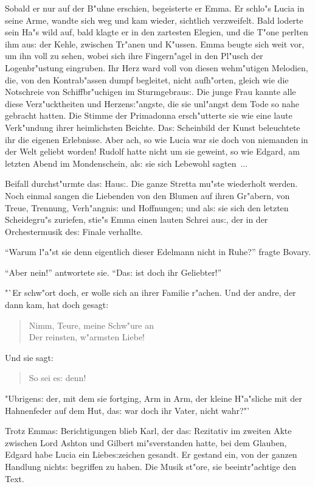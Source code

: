 \documentclass[oneside,12pt]{book}
\newcommand{\s}{s:}%
\begin{document}
Sobald er nur auf der B"uhne erschien, begeisterte er Emma. Er
schlo"s Lucia in seine Arme, wandte sich weg und kam wieder,
sichtlich verzweifelt. Bald loderte sein Ha"s wild auf, bald
klagte er in den zartesten Elegien, und die T"one perlten ihm
au{\s} der Kehle, zwischen Tr"anen und K"ussen. Emma beugte sich
weit vor, um ihn voll zu sehen, wobei sich ihre Fingern"agel in
den Pl"usch der Logenbr"ustung eingruben. Ihr Herz ward voll von
diesen wehm"utigen Melodien, die, von den Kontrab"assen dumpf
begleitet, nicht aufh"orten, gleich wie die Notschreie von
Schiffbr"uchigen im Sturmgebrau{\s}. Die junge Frau kannte alle
diese Verz"ucktheiten und Herzen{\s}"angste, die sie unl"angst
dem Tode so nahe gebracht hatten. Die Stimme der Primadonna
ersch"utterte sie wie eine laute Verk"undung ihrer heimlichsten
Beichte. Da{\s} Scheinbild der Kunst beleuchtete ihr die eigenen
Erlebnisse. Aber ach, so wie Lucia war sie doch von niemanden in
der Welt geliebt worden! Rudolf hatte nicht um sie geweint, so wie
Edgard, am letzten Abend im Mondenschein, al{\s} sie sich Lebewohl
sagten~...

Beifall durchst"urmte da{\s} Hau{\s}. Die ganze Stretta mu"ste
wiederholt werden. Noch einmal sangen die Liebenden von den Blumen
auf ihren Gr"abern, von Treue, Trennung, Verh"angni{\s} und
Hoffnungen; und al{\s} sie sich den letzten Scheidegru"s zuriefen,
stie"s Emma einen lauten Schrei au{\s}, der in der Orchestermusik
de{\s} Finale verhallte.

"`Warum l"a"st sie denn eigentlich dieser Edelmann nicht in
Ruhe?"' fragte Bovary.

"`Aber nein!"' antwortete sie. "`Da{\s} ist doch ihr Geliebter!"'

"`Er schw"ort doch, er wolle sich an ihrer Familie r"achen. Und
der andre, der dann kam, hat doch gesagt:
\begin{verse}
{\glq}Nimm, Teure, meine Schw"ure an \\
Der reinsten, w"armsten Liebe!{\grq}
\end{verse}
Und sie sagt:
\begin{verse}
{\glq}So sei e{\s} denn!{\grq}
\end{verse}
"Ubrigen{\s} der, mit dem sie fortging, Arm in Arm, der kleine
H"a"sliche mit der Hahnenfeder auf dem Hut, da{\s} war doch ihr
Vater, nicht wahr?"'

Trotz Emma{\s} Berichtigungen blieb Karl, der da{\s} Rezitativ im
zweiten Akte zwischen Lord Ashton und Gilbert mi"sverstanden
hatte, bei dem Glauben, Edgard habe Lucia ein Liebe{\s}zeichen
gesandt. Er gestand ein, von der ganzen Handlung nicht{\s}
begriffen zu haben. Die Musik st"ore, sie beeintr"achtige den
Text.
\end{document}
